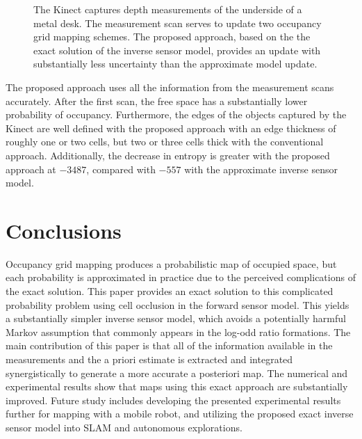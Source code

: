 \documentclass[letterpaper, 10pt, conference]{ieeeconf}
\begin{document}
\begin{figure}
{{	}
	\hfill
}
\caption{The Kinect captures depth measurements of the underside of a metal desk. The measurement scan serves to update two occupancy grid mapping schemes. The proposed approach, based on the the exact solution of the inverse sensor model, provides an update with substantially less uncertainty than the approximate model update.}\label{fig:ExpRes}
\end{figure}


The proposed approach uses all the information from the measurement scans accurately. After the first scan, the free space has a substantially lower probability of occupancy. Furthermore, the edges of the objects captured by the Kinect are well defined with the proposed approach with an edge thickness of roughly one or two cells, but two or three cells thick with the conventional approach. Additionally, the decrease in entropy is greater with the proposed approach at $-3487$, compared with $-557$ with the approximate inverse sensor model.


\section{Conclusions}

Occupancy grid mapping produces a probabilistic map of occupied space, but each probability is approximated in practice due to the perceived complications of the exact solution.
This paper provides an exact solution to this complicated probability problem using cell occlusion in the forward sensor model. This yields a substantially simpler inverse sensor model, which avoids a potentially harmful Markov assumption that commonly appears in the log-odd ratio formations. The main contribution of this paper is that all of the information available in the measurements and the a priori estimate is extracted and integrated synergistically to generate a more accurate a posteriori map. The numerical and experimental results show that maps using this exact approach are substantially improved. Future study includes developing the presented experimental results further for mapping with a mobile robot, and utilizing the proposed exact inverse sensor model into SLAM and autonomous explorations. 
	
\end{document}
